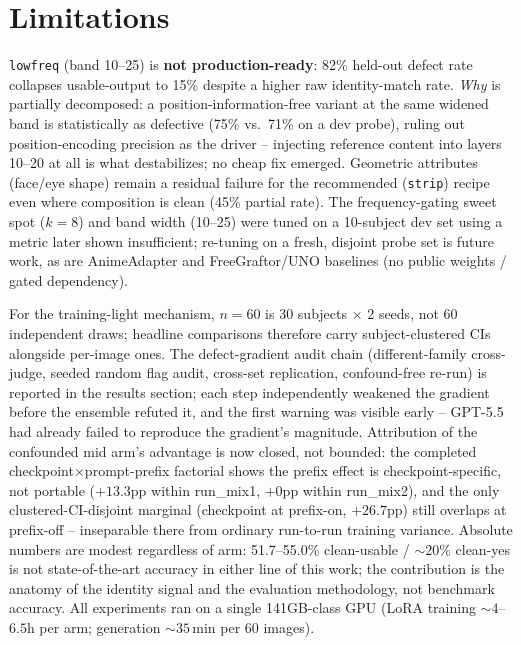 \section{Limitations}\label{sec:limits}

\texttt{lowfreq} (band 10--25) is \textbf{not production-ready}: 82\%
held-out defect rate collapses usable-output to 15\% despite a higher
raw identity-match rate. \emph{Why} is partially decomposed: a
position-information-free variant at the same widened band is
statistically as defective (75\% vs.\ 71\% on a dev probe), ruling out
position-encoding precision as the driver -- injecting reference
content into layers 10--20 at all is what destabilizes; no cheap fix
emerged.
Geometric attributes (face/eye shape) remain a residual failure for the
recommended (\texttt{strip}) recipe even where composition is clean
(45\% partial rate). The frequency-gating sweet spot ($k{=}8$) and band
width (10--25) were tuned on a 10-subject dev set using a metric later
shown insufficient; re-tuning on a fresh, disjoint probe set is future
work, as are AnimeAdapter and FreeGraftor/UNO baselines (no public
weights / gated dependency).

For the training-light mechanism, $n{=}60$ is 30 subjects $\times$ 2
seeds, not 60 independent draws; headline comparisons therefore carry
subject-clustered CIs alongside per-image ones. The defect-gradient
audit chain (different-family cross-judge, seeded random flag audit,
cross-set replication, confound-free re-run) is reported in the results
section; each step independently weakened the gradient before the
ensemble refuted it, and the first warning was visible early -- GPT-5.5
had already failed to reproduce the gradient's magnitude. Attribution
of the confounded mid arm's advantage is now closed, not bounded: the
completed checkpoint$\times$prompt-prefix factorial shows the prefix
effect is checkpoint-specific, not portable ($+13.3$pp within
run\_mix1, $+0$pp within run\_mix2), and the only clustered-CI-disjoint
marginal (checkpoint at prefix-on, $+26.7$pp) still overlaps at
prefix-off -- inseparable there from ordinary run-to-run training
variance. Absolute numbers are modest
regardless of arm: 51.7--55.0\% clean-usable / ${\sim}20$\% clean-yes
is not state-of-the-art accuracy in either line of this work; the
contribution is the anatomy of the identity signal and the evaluation
methodology, not benchmark accuracy. All experiments ran on a single
141GB-class GPU (LoRA training ${\sim}4$--$6.5$h per arm; generation
${\sim}35$\,min per 60 images).

